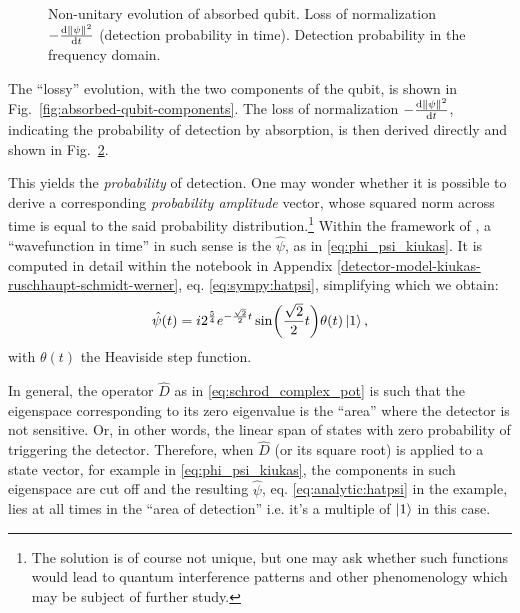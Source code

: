 \begin{figure}
\begin{subfigure}[b]{0.49\textwidth}
    \subcaption{}\label{fig:absorbed-qubit-normalization-loss:omega}
  \end{subfigure}
  \caption{
    Non-unitary evolution of absorbed qubit.
      Loss of normalization $-\dv{\norm{\psi}^2}{t}$ (detection probability in time).
      Detection probability in the frequency domain.
  }
  \label{fig:absorbed-qubit-normalization-loss}
\end{figure}

The ``lossy'' evolution, with the two components of the qubit, is shown in Fig.~\ref{fig:absorbed-qubit-components}.
The loss of normalization $-\dv{\norm{\psi}^2}{t}$, indicating the probability of detection by absorption,
is then derived directly and shown in Fig.~\ref{fig:absorbed-qubit-normalization-loss}.

This yields the \emph{probability} of detection.
One may wonder whether it is possible to derive a corresponding \emph{probability amplitude} vector,
whose squared norm across time is equal to the said probability distribution.\footnote{
  The solution is of course not unique, but one may ask whether such functions would lead
  to quantum interference patterns and other phenomenology which may be subject of further study.
}
Within the framework of \cite{RuschhauptAbsorption}, a ``wavefunction in time'' in such sense
is the $\hat{\psi}$, as in \eqref{eq:phi_psi_kiukas}.
It is computed in detail within the
notebook in Appendix \ref{detector-model-kiukas-ruschhaupt-schmidt-werner}, eq. \eqref{eq:sympy:hatpsi},
simplifying which we obtain:
\begin{equation}\label{eq:analytic:hatpsi}
  \hat{\psi}(t) =
    i 2^{\frac{5}{4}} e^{-\frac{\sqrt{2}}{2}t}\sin(\frac{\sqrt{2}}{2}t) \theta(t)
    \ket{1}
    \text{,}
\end{equation}
with $\theta(t)$ the Heaviside step function.

In general, the operator $\hat{D}$ as in \eqref{eq:schrod_complex_pot}
is such that the eigenspace corresponding to its zero eigenvalue
is the ``area'' where the detector is not sensitive. Or, in other words,
the linear span of states with zero probability of triggering the detector.
Therefore, when $\hat{D}$ (or its square root) is applied to a state vector,
for example in \eqref{eq:phi_psi_kiukas},
the components in such eigenspace are cut off and the resulting
$\hat{\psi}$, eq. \eqref{eq:analytic:hatpsi} in the example, lies at all times in the ``area of detection''
i.e. it's a multiple of $\ket{1}$ in this case.

